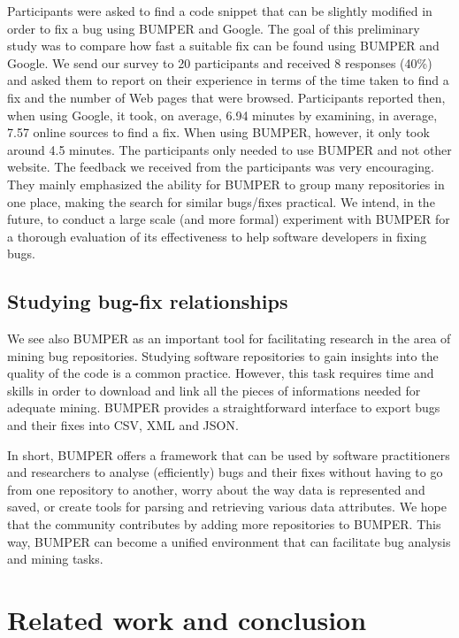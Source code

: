 \documentclass[conference]{IEEEtran}
\begin{document}
Participants were asked to find a code snippet that can be slightly modified in order to fix a bug using BUMPER and Google. The goal of this preliminary study was to compare how fast a suitable fix can be found using BUMPER and Google.
We send our survey to 20 participants and received 8 responses (40\%) and asked them to report on their experience in terms of the time taken to find a fix and the number of Web pages that were browsed.
Participants reported then, when using Google, it took, on average, 6.94 minutes by examining, in average, 7.57 online sources to find a fix.
When using BUMPER, however, it only took around 4.5 minutes. The participants only needed to use BUMPER and not other website. The feedback we received from the participants was very encouraging. They mainly emphasized the ability for BUMPER to group many repositories in one place, making the search for similar bugs/fixes practical. We intend, in the future, to conduct a large scale (and more formal) experiment with BUMPER for a thorough evaluation of its effectiveness to help software developers in fixing bugs.

\subsection{Studying bug-fix relationships}
\label{subs:Studying bug-fix relationships}

We see also BUMPER as an important tool for facilitating research in the area of mining bug repositories. Studying software repositories to gain insights into the quality of the code is a common practice. However, this task requires time and skills in order to download and link all the pieces of informations needed for adequate mining. BUMPER provides a straightforward interface to export bugs and their fixes into CSV, XML and JSON.

In short, BUMPER offers a framework that can be used by software practitioners and researchers to analyse (efficiently) bugs and their fixes without having to go from one repository to another,  worry about the way data is represented and saved, or create tools for parsing and retrieving various data attributes. We hope that the community contributes by adding more repositories to BUMPER. This way, BUMPER can become a unified environment that can facilitate bug analysis and mining tasks.

\section{Related work and conclusion}
\label{sec:conclusion}
\end{document}
